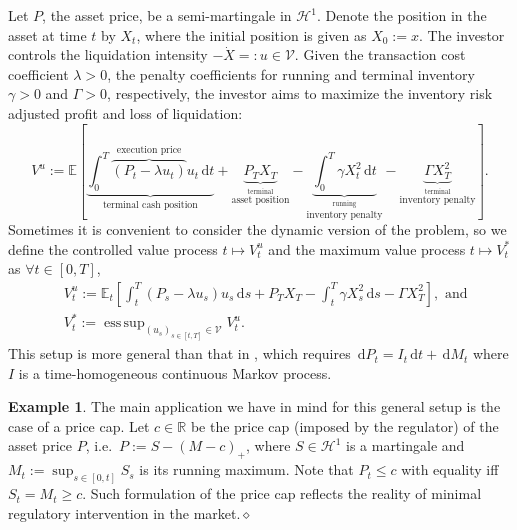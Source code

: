 \documentclass[openany,oneside]{article}
\theoremstyle{definition}
\newtheorem{eg}[thm]{Example}
\theoremstyle{remark}
\newcommand{\E}{\mathbb{E}} %
\newcommand{\ts}{\textstyle}
\DeclareMathOperator{\esssup}{ess\, sup}
\newcommand{\close}{\hspace*{\fill}$\diamond$}
\newcommand{\de}{\,\mathrm{d}}
\begin{document}
Let $P$, the asset price, be a semi-martingale in $\mathcal{H}^1$. Denote the position in the asset at time $t$ by $X_t$, where the initial position is given as $X_0:=x$. The investor controls the liquidation intensity $-\dot{X} =: u \in \mathcal{V}$. Given the transaction cost coefficient $\lambda>0$, the penalty coefficients for running and terminal inventory $\gamma>0$ and $\Gamma>0$, respectively, the investor aims to maximize the inventory risk adjusted profit and loss of liquidation:
\[
\ts V^u:= \E\left[\underbrace{\int_0^T \overbrace{(P_t - \lambda u_t)}^{\textrm{execution price}} u_t \de t}_{\textrm{terminal cash position}} + \underbrace{P_T X_T}_{\stackrel{\textrm{terminal}}{\textrm{asset position}}} - \underbrace{\int_0^T \gamma X_t^2 \de t}_{\stackrel{\textrm{running}}{\textrm{inventory penalty}}} - \underbrace{\Gamma X_T^2}_{\stackrel{\textrm{terminal}}{\textrm{inventory penalty}}} \right].
\]
Sometimes it is convenient to consider the dynamic version of the problem, so we define the controlled value process $t\mapsto V^u_t$ and the maximum value process $t\mapsto V^\ast_t$ as $\forall t\in[0,T]$,
\begin{align*}
&\ts V^u_t := \E_t \left[\int_t^T (P_s-\lambda u_s)u_s \de s + P_T X_T -\int_t^T \gamma X_s^2 \de s - \Gamma X_T^2 \right], \textrm{ and} \\
&\ts V^\ast_t := \esssup_{(u_s)_{s\in[t,T]}\in\mathcal{V}} V^u_t.
\end{align*}
This setup is more general than that in \cite{lehalle2017incorporating}, which requires $\de P_t = I_t \de t + \de M_t$ where $I$ is a time-homogeneous continuous Markov process.

\begin{eg}
The main application we have in mind for this general setup is the case of a price cap. Let $c\in\mathbb{R}$ be the price cap (imposed by the regulator) of the asset price $P$, i.e.\ $P:=S-(M-c)_+$, where $S\in\mathcal{H}^1$ is a martingale and $M_t:=\sup_{s\in[0,t]} S_s$ is its running maximum. Note that $P_t\le c$ with equality iff $S_t=M_t\ge c$. Such formulation of the price cap reflects the reality of minimal regulatory intervention in the market.\close
\end{eg}


\end{document}
